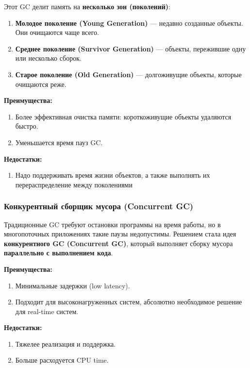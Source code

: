 Этот GC делит память на \textbf{несколько зон (поколений)}:
\begin{enumerate}[label=\arabic*.]
    \item \textbf{Молодое поколение (Young Generation)} — недавно созданные объекты. Они очищаются чаще всего.
    \item \textbf{Среднее поколение (Survivor Generation)} — объекты, пережившие одну или несколько сборок.
    \item \textbf{Старое поколение (Old Generation)} — долгоживущие объекты, которые очищаются реже.
\end{enumerate}

\textbf{Преимущества:}
\begin{enumerate}[label=\arabic*.]
    \item Более эффективная очистка памяти: короткоживущие объекты удаляются быстро.
    \item Уменьшается время пауз GC.
\end{enumerate}

\textbf{Недостатки:}
\begin{enumerate}[label=\arabic*.]
    \item Надо поддерживать время жизни объектов, а также выполнять их перераспределение между поколениями
\end{enumerate}


\subsubsection{Конкурентный сборщик мусора (Concurrent GC)}

Традиционные GC требуют остановки программы на время работы, но в многопоточных приложениях такие паузы недопустимы. Решением стала идея \textbf{конкурентного GC (Concurrent GC)}, который выполняет сборку мусора \textbf{параллельно с выполнением кода}.

\textbf{Преимущества:}
\begin{enumerate}[label=\arabic*.]
    \item Минимальные задержки (low latency).
    \item Подходит для высоконагруженных систем, абсолютно необходимое решение для real-time систем.
\end{enumerate}

\textbf{Недостатки:}
\begin{enumerate}[label=\arabic*.]
    \item Тяжелее реализация и поддержка.
    \item Больше расходуется CPU time.
\end{enumerate}

